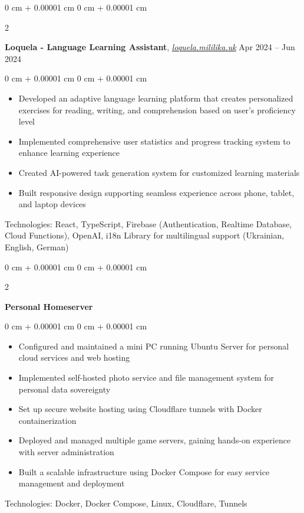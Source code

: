 \documentclass[10pt, letterpaper]{article}
\newenvironment{highlights}{
    \begin{itemize}[
        topsep=0.10 cm,
        parsep=0.10 cm,
        partopsep=0pt,
        itemsep=0pt,
        leftmargin=0 cm + 10pt
    ]
}{
    \end{itemize}
} %
\newenvironment{onecolentry}{
    \begin{adjustwidth}{
        0 cm + 0.00001 cm
    }{
        0 cm + 0.00001 cm
    }
}{
    \end{adjustwidth}
} %
\newenvironment{twocolentry}[2][]{
    \onecolentry
    \def\secondColumn{#2}
    \setcolumnwidth{\fill, 4.5 cm}
    \begin{paracol}{2}
}{
    \switchcolumn \raggedleft \secondColumn
    \end{paracol}
    \endonecolentry
} %
\let\hrefWithoutArrow\href
\begin{document}
    \begin{twocolentry}{
        Apr 2024 – Jun 2024
    }
        \textbf{Loquela - Language Learning Assistant}, \hrefWithoutArrow{https://loquela.mililika.uk}{\textit{loquela.mililika.uk}} \end{twocolentry}
    \vspace{0.20 cm}
    \begin{onecolentry}
        \begin{highlights}
            \item Developed an adaptive language learning platform that creates personalized exercises for reading, writing, and comprehension based on user's proficiency level
            \item Implemented comprehensive user statistics and progress tracking system to enhance learning experience
            \item Created AI-powered task generation system for customized learning materials
            \item Built responsive design supporting seamless experience across phone, tablet, and laptop devices
        \end{highlights}
    \end{onecolentry}
    \vspace{0.2 cm}
    Technologies: React, TypeScript, Firebase (Authentication, Realtime Database, Cloud Functions), OpenAI, i18n Library for multilingual support (Ukrainian, English, German)

    \vspace{0.4 cm}

    \begin{twocolentry}{}
        \textbf{Personal Homeserver} \end{twocolentry}
    \vspace{0.20 cm}
    \begin{onecolentry}
        \begin{highlights}
            \item Configured and maintained a mini PC running Ubuntu Server for personal cloud services and web hosting
            \item Implemented self-hosted photo service and file management system for personal data sovereignty
            \item Set up secure website hosting using Cloudflare tunnels with Docker containerization
            \item Deployed and managed multiple game servers, gaining hands-on experience with server administration
            \item Built a scalable infrastructure using Docker Compose for easy service management and deployment
        \end{highlights}
    \end{onecolentry}
    \vspace{0.2 cm}
    Technologies: Docker, Docker Compose, Linux, Cloudflare, Tunnels
    
\end{document}
